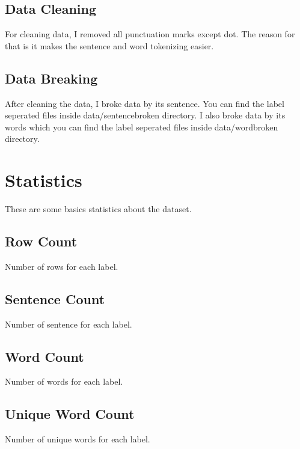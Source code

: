 \subsection{Data Cleaning}
For cleaning data, I removed all punctuation marks except dot. The reason for that is it makes the sentence and word tokenizing easier.

\subsection{Data Breaking}
After cleaning the data, I broke data by its sentence. You can find the label seperated files inside data/sentencebroken directory. I also
broke data by its words which you can find the label seperated files inside data/wordbroken directory.

\section{Statistics}
These are some basics statistics about the dataset.

\subsection{Row Count}
Number of rows for each label.
\begin{adjustbox}{max width=\textwidth}
\end{adjustbox}

\subsection{Sentence Count}
Number of sentence for each label.
\begin{adjustbox}{max width=\textwidth}
\end{adjustbox}

\subsection{Word Count}
Number of words for each label.
\begin{adjustbox}{max width=\textwidth}
\end{adjustbox}

\subsection{Unique Word Count}
Number of unique words for each label.
\begin{adjustbox}{max width=\textwidth}
\end{adjustbox}

